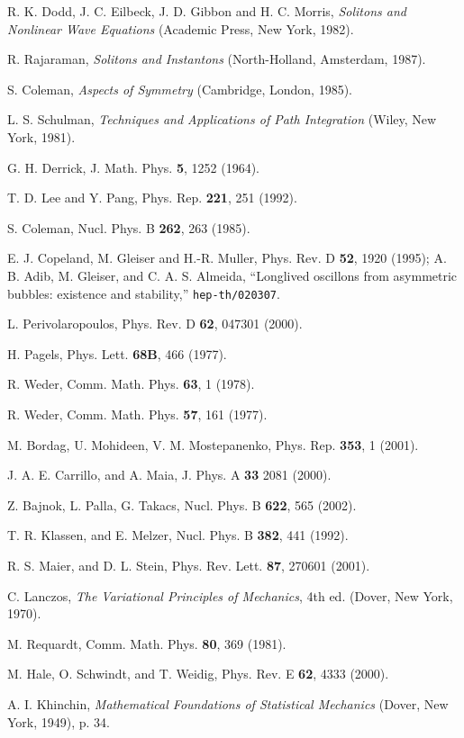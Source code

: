 \documentclass[a4paper,prd,twocolumn,showpacs,amsmath]{revtex4}
\begin{document}
\begin{thebibliography}{99}

 R. K. Dodd, J. C. Eilbeck, J. D. Gibbon and H. C. Morris,
  {\em Solitons and Nonlinear Wave Equations} (Academic Press, New York, 1982).

 R. Rajaraman, {\em
Solitons and Instantons} (North-Holland,  Amsterdam, 1987).

 S. Coleman, {\em Aspects of Symmetry} (Cambridge, London, 1985).

 L. S. Schulman, {\em Techniques and Applications of Path Integration} (Wiley, New York,
1981).

 G. H. Derrick, J. Math. Phys. {\bf 5}, 1252 (1964).

 T. D. Lee and Y. Pang, Phys. Rep. {\bf 221}, 251 (1992).

 S. Coleman, Nucl. Phys. B {\bf 262}, 263 (1985).

 E. J. Copeland, M. Gleiser and H.-R. Muller, Phys. Rev. D
{\bf 52}, 1920 (1995); A. B. Adib, M. Gleiser, and C. A. S. Almeida, ``Longlived
oscillons from asymmetric bubbles: existence and stability,''
{\tt hep-th/020307}.

 L. Perivolaropoulos, Phys. Rev. D {\bf 62}, 047301 (2000).

 H. Pagels, Phys. Lett. {\bf 68B}, 466 (1977).

 R. Weder, Comm. Math. Phys. {\bf 63}, 1 (1978).

 R. Weder, Comm. Math. Phys. {\bf 57}, 161 (1977).

 M. Bordag, U. Mohideen, V. M. Mostepanenko, Phys. Rep. {\bf 353}, 1 (2001).

 J. A. E. Carrillo, and A. Maia, J. Phys. A {\bf 33} 2081 (2000).

 Z. Bajnok, L. Palla, G. Takacs, Nucl. Phys. B {\bf 622}, 565 (2002).

 T. R. Klassen, and E. Melzer, Nucl. Phys. B {\bf 382}, 441 (1992).

 R. S. Maier, and D. L. Stein, Phys. Rev. Lett. {\bf 87}, 270601 (2001).

 C. Lanczos, {\em The Variational Principles of Mechanics},
4th ed. (Dover, New York, 1970).

 M. Requardt, Comm. Math. Phys. {\bf 80}, 369 (1981).

 M. Hale, O. Schwindt, and T. Weidig, Phys. Rev. E {\bf 62}, 4333 (2000).

 A. I. Khinchin, {\em Mathematical Foundations of Statistical Mechanics}
(Dover, New York, 1949), p. 34.

\end{thebibliography}
\end{document}
